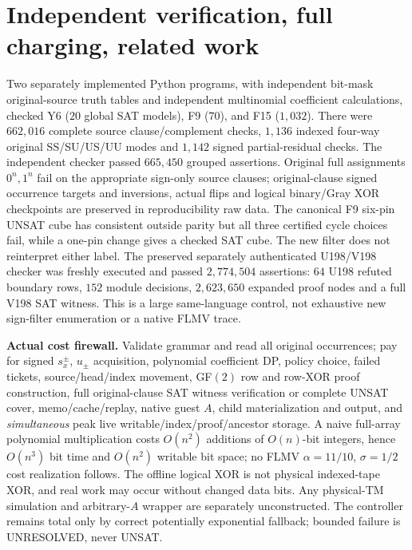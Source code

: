 \documentclass[11pt]{article}
\begin{document}
\section{Independent verification, full charging, related work}
Two separately implemented Python programs, with independent bit-mask original-source truth tables and independent multinomial coefficient calculations, checked Y6 ($20$ global SAT models), F9 ($70$), and F15 ($1{,}032$). There were $662{,}016$ complete source clause/complement checks, $1{,}136$ indexed four-way original SS/SU/US/UU modes and $1{,}142$ signed partial-residual checks. The independent checker passed $665{,}450$ grouped assertions. Original full assignments $0^n,1^n$ fail on the appropriate sign-only source clauses; original-clause signed occurrence targets and inversions, actual flips and logical binary/Gray XOR checkpoints are preserved in reproducibility raw data. The canonical F9 six-pin UNSAT cube has consistent outside parity but all three certified cycle choices fail, while a one-pin change gives a checked SAT cube. The new filter does not reinterpret either label.
The preserved separately authenticated U198/V198 checker was freshly executed and passed $2{,}774{,}504$ assertions: $64$ U198 refuted boundary rows, $152$ module decisions, $2{,}623{,}650$ expanded proof nodes and a full V198 SAT witness. This is a large same-language control, not exhaustive new sign-filter enumeration or a native FLMV trace.

\noindent\textbf{Actual cost firewall.} Validate grammar and read all original occurrences; pay for signed $s_x^\pm$, $u_\pm$ acquisition, polynomial coefficient DP, policy choice, failed tickets, source/head/index movement, GF$(2)$ row and row-XOR proof construction, full original-clause SAT witness verification or complete UNSAT cover, memo/cache/replay, native guest $A$, child materialization and output, and \emph{simultaneous} peak live writable/index/proof/ancestor storage. A naive full-array polynomial multiplication costs $O(n^2)$ additions of $O(n)$-bit integers, hence $O(n^3)$ bit time and $O(n^2)$ writable bit space; no FLMV $\alpha=11/10$, $\sigma=1/2$ cost realization follows. The offline logical XOR is not physical indexed-tape XOR, and real work may occur without changed data bits. Any physical-TM simulation and arbitrary-$A$ wrapper are separately unconstructed. The controller remains total only by correct potentially exponential fallback; bounded failure is UNRESOLVED, never UNSAT.
\end{document}
